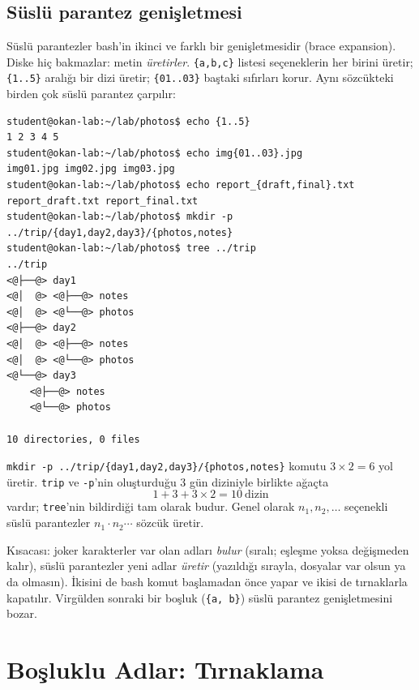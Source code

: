 \documentclass[11pt,a4paper]{article}
\newcommand{\cmd}[1]{\texttt{#1}}
\begin{document}
\subsection{Süslü parantez genişletmesi}

Süslü parantezler bash'in ikinci ve farklı bir genişletmesidir (brace expansion). Diske hiç bakmazlar: metin \emph{üretirler}. \texttt{\{a,b,c\}} listesi seçeneklerin her birini üretir; \texttt{\{1..5\}} aralığı bir dizi üretir; \texttt{\{01..03\}} baştaki sıfırları korur. Aynı sözcükteki birden çok süslü parantez çarpılır:

\begin{lstlisting}[style=term]
student@okan-lab:~/lab/photos$ echo {1..5}
1 2 3 4 5
student@okan-lab:~/lab/photos$ echo img{01..03}.jpg
img01.jpg img02.jpg img03.jpg
student@okan-lab:~/lab/photos$ echo report_{draft,final}.txt
report_draft.txt report_final.txt
student@okan-lab:~/lab/photos$ mkdir -p ../trip/{day1,day2,day3}/{photos,notes}
student@okan-lab:~/lab/photos$ tree ../trip
../trip
<@├──@> day1
<@│  @> <@├──@> notes
<@│  @> <@└──@> photos
<@├──@> day2
<@│  @> <@├──@> notes
<@│  @> <@└──@> photos
<@└──@> day3
    <@├──@> notes
    <@└──@> photos

10 directories, 0 files
\end{lstlisting}

\begin{example}
\cmd{mkdir -p ../trip/\{day1,day2,day3\}/\{photos,notes\}} komutu $3 \times 2 = 6$ yol üretir. \texttt{trip} ve \cmd{-p}'nin oluşturduğu $3$ gün diziniyle birlikte ağaçta
\[
1 + 3 + 3 \times 2 = 10 \ \text{dizin}
\]
vardır; \cmd{tree}'nin bildirdiği tam olarak budur. Genel olarak $n_1, n_2, \dots$ seçenekli süslü parantezler $n_1 \cdot n_2 \cdots$ sözcük üretir.
\end{example}

Kısacası: joker karakterler var olan adları \emph{bulur} (sıralı; eşleşme yoksa değişmeden kalır), süslü parantezler yeni adlar \emph{üretir} (yazıldığı sırayla, dosyalar var olsun ya da olmasın).
İkisini de bash komut başlamadan önce yapar ve ikisi de tırnaklarla kapatılır. Virgülden sonraki bir boşluk (\texttt{\{a, b\}}) süslü parantez genişletmesini bozar.

\section{Boşluklu Adlar: Tırnaklama}
\end{document}

